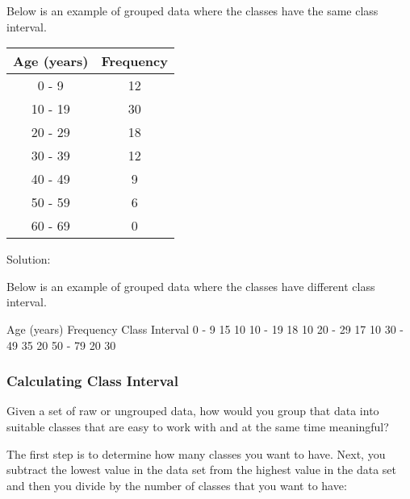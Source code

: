 \documentclass{beamer}
\begin{document}
\begin{frame}
	Below is an example of grouped data where the classes have the same class interval.
	\begin{center}
		\begin{tabular}{|c|c|}
			\hline Age (years)	&	Frequency	\\ \hline
			0 - 9	&	12	\\ \hline
			10 - 19	&	30	\\ \hline
			20 - 29	&	18	\\ \hline
			30 - 39	&	12	\\ \hline
			40 - 49	&	9	\\ \hline
			50 - 59	&	6	\\ \hline
			60 - 69	&	0	\\ \hline
		\end{tabular} 
	\end{center}
	
\end{frame}
\begin{frame}
	Solution:
	
	Below is an example of grouped data where the classes have different class interval.
	
	Age (years)	 Frequency		 Class Interval
	0 - 9	 	15	 	10
	10 - 19	 	18	 	10
	20 - 29	 	17	 	10
	30 - 49	 	35	 	20
	50 - 79	 	20	 	30
	
\end{frame}
\begin{frame}
	\frametitle{Calculating Class Interval}
	Given a set of raw or ungrouped data, how would you group that data into suitable classes that are easy to work with and at the same time meaningful?
	
	The first step is to determine how many classes you want to have. 
	Next, you subtract the lowest value in the data set from the highest value in the data set and then you divide by the number of classes that you want to have:
	
\end{frame}
\end{document}
